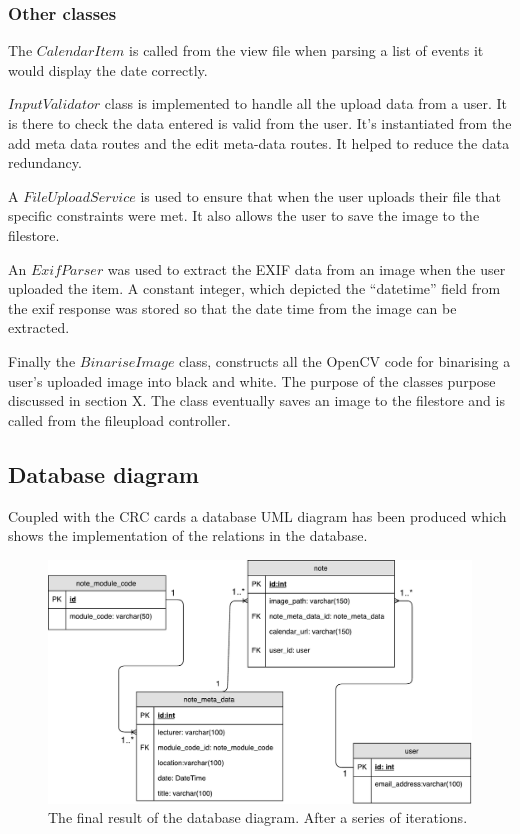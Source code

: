 \subsubsection{Other classes}
The $CalendarItem$ is called from the view file when parsing a list of events it would display the date correctly.

$InputValidator$ class is implemented to handle all the upload data from a user. It is there to check the data entered is valid from the user. It's instantiated from the add meta data routes and the edit meta-data routes. It helped to reduce the data redundancy.

A $FileUploadService$ is used to ensure that when the user uploads their file that specific constraints were met. It also allows the user to save the image to the filestore.

An $ExifParser$ was used to extract the EXIF data from an image when the user uploaded the item. A constant integer, which depicted the ``datetime'' field from the exif response was stored so that the date time from the image can be extracted.

Finally the $BinariseImage$ class, constructs all the OpenCV code for binarising a user's uploaded image into black and white. The purpose of the classes purpose discussed in section X. The class eventually saves an image to the filestore and is called from the fileupload controller.


\subsection{Database diagram}
Coupled with the CRC cards a database UML diagram has been produced which shows the implementation of the relations in the database.

\begin{figure}[h]
  \centering
  \includegraphics[scale=0.5]{images/database_diagram}
  \caption{The final result of the database diagram. After a series of iterations.}
  \label{fig:database}
\end{figure}

